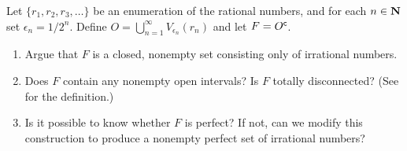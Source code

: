 \documentclass{lew98_solutions}
\begin{document}
\begin{exercise}
\label{ex:3.4.9}
    Let \( \{ r_1, r_2, r_3, \ldots \} \) be an enumeration of the rational numbers, and for each \( n \in \mathbf{N} \) set \( \epsilon_n = 1/2^n \). Define \( O = \bigcup_{n=1}^{\infty} V_{\epsilon_n}(r_n) \) and let \( F = O^{\mathsf{c}} \).
    \begin{enumerate}
        \item Argue that \( F \) is a closed, nonempty set consisting only of irrational numbers.

        \item Does \( F \) contain any nonempty open intervals? Is \( F \) totally disconnected? (See  for the definition.)

        \item Is it possible to know whether \( F \) is perfect? If not, can we modify this construction to produce a nonempty perfect set of irrational numbers?
    \end{enumerate}
\end{exercise}
\end{document}
